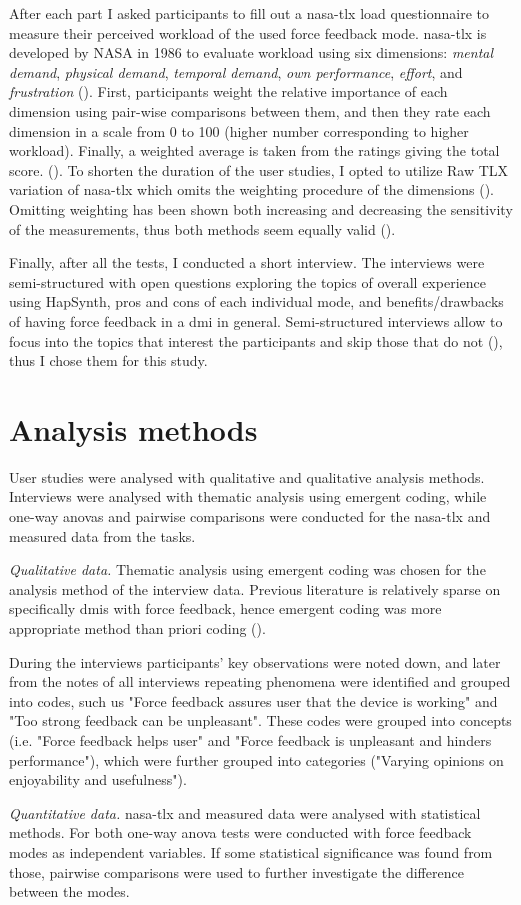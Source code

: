 After each part I asked participants to fill out a \gls{nasa-tlx} load questionnaire to measure their perceived workload of the used force feedback mode. \gls{nasa-tlx} is developed by NASA in 1986 to evaluate workload using six dimensions: \textit{mental demand}, \textit{physical demand}, \textit{temporal demand}, \textit{own performance}, \textit{effort}, and \textit{frustration} (\cite{hart1986}). First, participants weight the relative importance of each dimension using pair-wise comparisons between them, and then they rate each dimension in a scale from 0 to 100 (higher number corresponding to higher workload). Finally, a weighted average is taken from the ratings giving the total score. (\cite{hart1986}). To shorten the duration of the user studies, I opted to utilize Raw TLX variation of \gls{nasa-tlx} which omits the weighting procedure of the dimensions (\cite{hart2006}). Omitting weighting has been shown both increasing and decreasing the sensitivity of the measurements, thus both methods seem equally valid (\cite{hart2006}).

Finally, after all the tests, I conducted a short interview. The interviews were semi-structured with open questions exploring the topics of overall experience using HapSynth, pros and cons of each individual mode, and benefits/drawbacks of having force feedback in a \gls{dmi} in general. Semi-structured interviews allow to focus into the topics that interest the participants and skip those that do not (\cite{lazar2017}), thus I chose them for this study.

\section{Analysis methods}

User studies were analysed with qualitative and qualitative analysis methods. Interviews were analysed with thematic analysis using emergent coding, while one-way \glspl{anova} and pairwise comparisons were conducted for the \gls{nasa-tlx} and measured data from the tasks.

\textit{Qualitative data.} Thematic analysis using emergent coding was chosen for the analysis method of the interview data. Previous literature is relatively sparse on specifically \glspl{dmi} with force feedback, hence emergent coding was more appropriate method than priori coding (\cite{lazar2017}).

During the interviews participants' key observations were noted down, and later from the notes of all interviews repeating phenomena were identified and grouped into codes, such us "Force feedback assures user that the device is working" and "Too strong feedback can be unpleasant". These codes were grouped into concepts (i.e. "Force feedback helps user" and "Force feedback is unpleasant and hinders performance"), which were further grouped into categories ("Varying opinions on enjoyability and usefulness").

\textit{Quantitative data.} \gls{nasa-tlx} and measured data were analysed with statistical methods. For both one-way \gls{anova} tests were conducted with force feedback modes as independent variables. If some statistical significance was found from those, pairwise comparisons were used to further investigate the difference between the modes.
